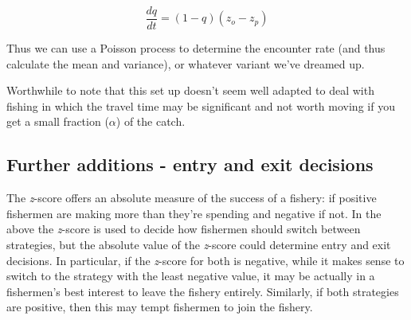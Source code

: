 \documentclass[11pt]{article}
\begin{document}
\begin{equation}
\frac{dq}{dt} = (1-q)(z_o - z_p)
\end{equation}

Thus we can use a Poisson process to determine the encounter rate (and thus calculate the mean and variance), or whatever variant we've dreamed up.

Worthwhile to note that this set up doesn't seem well adapted to deal with fishing in which the travel time may be significant and not worth moving if you get a small fraction ($\alpha$) of the catch.

\subsection*{Further additions - entry and exit decisions}

The \emph{z}-score offers an absolute measure of the success of a fishery: if positive fishermen are making more than they're spending and negative if not. In the above the \emph{z}-score is used to decide how fishermen should switch between strategies, but the absolute value of the \emph{z}-score could determine entry and exit decisions. In particular, if the \emph{z}-score for both is negative, while it makes sense to switch to the strategy with the least negative value, it may be actually in a fishermen's best interest to leave the fishery entirely. Similarly, if both strategies are positive, then this may tempt fishermen to join the fishery.



\end{document}
